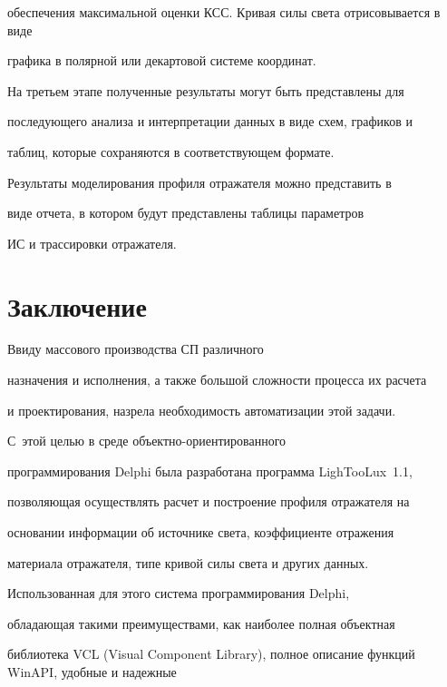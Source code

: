 обеспечения максимальной оценки КСС. Кривая силы света отрисовывается в виде 


графика в полярной или декартовой системе координат.


  


  На третьем этапе полученные результаты могут быть представлены для 


последующего анализа и интерпретации данных в виде схем, графиков и 


таблиц, которые сохраняются в соответствующем формате.


  


  Результаты моделирования профиля отражателя можно представить в 


виде отчета, в котором будут представлены таблицы параметров 


ИС и трассировки отражателя.


  


\section{Заключение}





  Ввиду массового производства СП различного 


назначения и исполнения, а также большой сложности процесса их расчета 


и проектирования, назрела необходимость автоматизации этой задачи. 


С~этой целью в среде объект\-но-ори\-ен\-ти\-ро\-ван\-но\-го 


программирования Delphi была разработана программа LighTooLux~1.1, 


позволяющая осуществлять расчет и построение профиля отражателя на 


основании информации об источнике света, коэффициенте отражения 


материала отражателя, типе кривой силы света и других данных.


  


  Использованная для этого система программирования Delphi, 


обладающая такими преимуществами, как наиболее полная объектная 


библиотека VCL (Visual Component Library), полное описание функций WinAPI, удобные и надежные 


